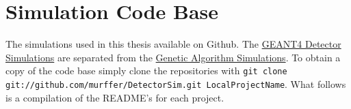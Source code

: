 \chapter{Simulation Code Base}
\label{chap:code}
The simulations used in this thesis available on Github.
The \href{https://github.com/murffer/DetectorSim}{GEANT4 Detector Simulations} are separated from the \href{https://github.com/murffer/GARPM8Opt}{Genetic Algorithm Simulations}.
To obtain a copy of the code base simply clone the repositories with \texttt{git clone git://github.com/murffer/DetectorSim.git LocalProjectName}.
What follows is a compilation of the README's for each project.

